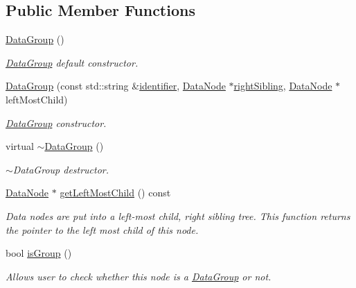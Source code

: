\subsection*{Public Member Functions}
\begin{DoxyCompactItemize}
\item 
\hyperlink{classDatabase_1_1DataGroup_a633bd46aaee7adafcb0181b12c2466f0}{Data\+Group} ()\hypertarget{classDatabase_1_1DataGroup_a633bd46aaee7adafcb0181b12c2466f0}{}\label{classDatabase_1_1DataGroup_a633bd46aaee7adafcb0181b12c2466f0}

\begin{DoxyCompactList}\small\item\em \hyperlink{classDatabase_1_1DataGroup}{Data\+Group} default constructor. \end{DoxyCompactList}\item 
\hyperlink{classDatabase_1_1DataGroup_a6d6a837e2f182b2b4e37768ace5bc7c3}{Data\+Group} (const std\+::string \&\hyperlink{classDatabase_1_1DataNode_a2417b60924a11cf9157b996fbf7b2ca5}{identifier}, \hyperlink{classDatabase_1_1DataNode}{Data\+Node} $\ast$\hyperlink{classDatabase_1_1DataNode_ae335fc33c3813e8a6638d50faef44d5d}{right\+Sibling}, \hyperlink{classDatabase_1_1DataNode}{Data\+Node} $\ast$left\+Most\+Child)
\begin{DoxyCompactList}\small\item\em \hyperlink{classDatabase_1_1DataGroup}{Data\+Group} constructor. \end{DoxyCompactList}\item 
virtual \hyperlink{classDatabase_1_1DataGroup_a88b36fe397284004ce86726e7808466e}{$\sim$\+Data\+Group} ()\hypertarget{classDatabase_1_1DataGroup_a88b36fe397284004ce86726e7808466e}{}\label{classDatabase_1_1DataGroup_a88b36fe397284004ce86726e7808466e}

\begin{DoxyCompactList}\small\item\em $\sim$\+Data\+Group destructor. \end{DoxyCompactList}\item 
\hyperlink{classDatabase_1_1DataNode}{Data\+Node} $\ast$ \hyperlink{classDatabase_1_1DataGroup_ac1e85f7959b06c6885c68ce58c13d509}{get\+Left\+Most\+Child} () const 
\begin{DoxyCompactList}\small\item\em Data nodes are put into a left-\/most child, right sibling tree. This function returns the pointer to the left most child of this node. \end{DoxyCompactList}\item 
bool \hyperlink{classDatabase_1_1DataGroup_a89bb1aa667805f278ad0dfa9172c3ee0}{is\+Group} ()
\begin{DoxyCompactList}\small\item\em Allows user to check whether this node is a \hyperlink{classDatabase_1_1DataGroup}{Data\+Group} or not. \end{DoxyCompactList}\end{DoxyCompactItemize}
